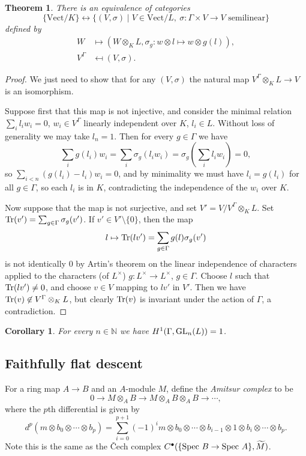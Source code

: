 \documentclass[letterpaper,11pt]{article}
\newtheorem{thm}{Theorem}
\newtheorem{cor}{Corollary}
\theoremstyle{definition}
\theoremstyle{remark}
\begin{document}
\begin{thm} There is an equivalence of categories
\[
\{\mbox{Vect}/K\} \leftrightarrow \{(V,\sigma)\mid V \in \mbox{Vect}/L,\ \sigma: \Gamma\times V \rightarrow V \mbox{ semilinear}\}
\]
defined by
\begin{align*}
W &\mapsto (W\otimes_K L, \sigma_g: w\otimes l \mapsto w\otimes g(l)),\\
V^\Gamma &\mapsfrom (V,\sigma).
\end{align*}
\end{thm}
\begin{proof} We just need to show that for any $(V,\sigma)$ the natural map $V^\Gamma\otimes_K L \rightarrow V$ is an isomorphism.

Suppose first that this map is not injective, and consider the minimal relation $\sum_i l_iw_i = 0$, $w_i\in V^\Gamma$ linearly independent over $K$, $l_i \in L$. Without loss of generality we may take $l_n = 1$. Then for every $g \in \Gamma$ we have
\[
\sum_i g(l_i)w_i = \sum_i \sigma_g(l_iw_i) = \sigma_g\left(\sum_i l_iw_i\right) = 0,
\]
so $\sum_{i<n} (g(l_i)-l_i)w_i = 0$, and by minimality we must have $l_i = g(l_i)$ for all $g \in \Gamma$, so each $l_i$ is in $K$, contradicting the independence of the $w_i$ over $K$.

Now suppose that the map is not surjective, and set $V' = V/V^\Gamma\otimes_KL$. Set $\mbox{\rm Tr}(v') = \sum_{g\in\Gamma}\sigma_g(v')$. If $v' \in V'\setminus\{0\}$, then the map
\[
l \mapsto \mbox{\rm Tr}(lv') = \sum_{g\in\Gamma}g(l)\sigma_g(v')
\]
is not identically $0$ by Artin's theorem on the linear independence of characters applied to the characters (of $L^\times$) $g:L^\times \rightarrow L^\times$, $g\in\Gamma$. Choose $l$ such that $\mbox{\rm Tr}(lv') \ne 0$, and choose $v\in V$ mapping to $lv'$ in $V'$. Then we have $\mbox{\rm Tr}(v) \not\in V^\Gamma\otimes_KL$, but clearly $\mbox{\rm Tr}(v)$ is invariant under the action of $\Gamma$, a contradiction.
\end{proof}

\begin{cor} For every $n\in \mathbb{N}$ we have $H^1(\Gamma,\mbox{\rm GL}_n(L)) = 1$.
\end{cor}

\subsection{Faithfully flat descent}

For a ring map $A\rightarrow B$ and an $A$-module $M$, define the \emph{Amitsur complex} to be
\[
0 \rightarrow M\otimes_AB \rightarrow M\otimes_AB\otimes_AB \rightarrow \cdots,
\]
where the $p$th differential is given by
\[
d^p(m\otimes b_0\otimes \cdots \otimes b_p) = \sum_{i=0}^{p+1} (-1)^i m\otimes b_0 \otimes \cdots \otimes b_{i-1} \otimes 1 \otimes b_i \otimes \cdots \otimes b_p.
\]
Note this is the same as the \v{C}ech complex $C^\bullet(\{\mbox{\rm Spec }B\rightarrow\mbox{\rm Spec }A\},\widetilde{M})$.
\end{document}
